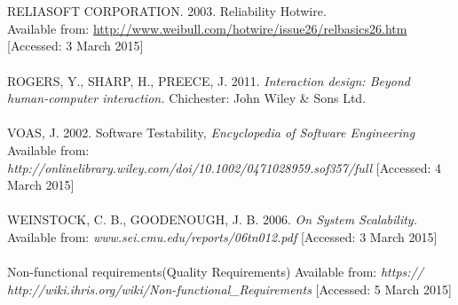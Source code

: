 \documentclass[a4paper]{article}
\begin{document}
\\
\\RELIASOFT CORPORATION. 2003. Reliability Hotwire.
\\Available from: \url{http://www.weibull.com/hotwire/issue26/relbasics26.htm}
[Accessed: 3 March 2015]
\\
\\ROGERS, Y., SHARP, H., PREECE, J. 2011.\textit{ Interaction design: Beyond human-computer interaction.} Chichester: John Wiley & Sons Ltd.
\\
\\VOAS, J. 2002. Software Testability,\textit{ Encyclopedia of Software Engineering}
Available from:\textit{ http://onlinelibrary.wiley.com/doi/10.1002/0471028959.sof357/full}
[Accessed: 4 March 2015]
\\
\\WEINSTOCK, C. B., GOODENOUGH, J. B. 2006. \textit{On System Scalability. }
Available from: \textit{www.sei.cmu.edu/reports/06tn012.pdf}
[Accessed: 3 March 2015]
\\
\\Non-functional requirements(Quality Requirements)
Available from:\textit{ https:// http://wiki.ihris.org/wiki/Non-functional_Requirements }
[Accessed: 5 March 2015]
\end{document}
